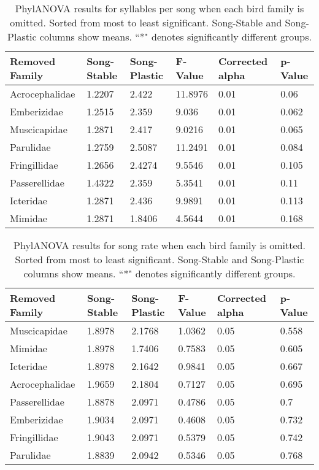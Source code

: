 \documentclass[a4paper,12pt]{article}
\begin{document}
\begin{table}[ht]
\caption{PhylANOVA results for syllables per song when each bird family is omitted.  Sorted from most to least significant.  Song-Stable and Song-Plastic columns show means.  ``*" denotes significantly different groups.}
\centering
\begin{tabular}{llllll}
  \hline
Removed Family & Song-Stable & Song-Plastic & F-Value & Corrected alpha & p-Value \\ 
  \hline
Acrocephalidae & 1.2207 & 2.422 & 11.8976 & 0.01 & 0.06 \\ 
  Emberizidae & 1.2515 & 2.359 & 9.036 & 0.01 & 0.062 \\ 
  Muscicapidae & 1.2871 & 2.417 & 9.0216 & 0.01 & 0.065 \\ 
  Parulidae & 1.2759 & 2.5087 & 11.2491 & 0.01 & 0.084 \\ 
  Fringillidae & 1.2656 & 2.4274 & 9.5546 & 0.01 & 0.105 \\ 
  Passerellidae & 1.4322 & 2.359 & 5.3541 & 0.01 & 0.11 \\ 
  Icteridae & 1.2871 & 2.436 & 9.9891 & 0.01 & 0.113 \\ 
  Mimidae & 1.2871 & 1.8406 & 4.5644 & 0.01 & 0.168 \\ 
   \hline
\end{tabular}
\end{table}

\begin{table}[ht]
\caption{PhylANOVA results for song rate when each bird family is omitted.  Sorted from most to least significant.  Song-Stable and Song-Plastic columns show means.  ``*" denotes significantly different groups.}
\centering
\begin{tabular}{llllll}
  \hline
Removed Family & Song-Stable & Song-Plastic & F-Value & Corrected alpha & p-Value \\ 
  \hline
Muscicapidae & 1.8978 & 2.1768 & 1.0362 & 0.05 & 0.558 \\ 
  Mimidae & 1.8978 & 1.7406 & 0.7583 & 0.05 & 0.605 \\ 
  Icteridae & 1.8978 & 2.1642 & 0.9841 & 0.05 & 0.667 \\ 
  Acrocephalidae & 1.9659 & 2.1804 & 0.7127 & 0.05 & 0.695 \\ 
  Passerellidae & 1.8878 & 2.0971 & 0.4786 & 0.05 & 0.7 \\ 
  Emberizidae & 1.9034 & 2.0971 & 0.4608 & 0.05 & 0.732 \\ 
  Fringillidae & 1.9043 & 2.0971 & 0.5379 & 0.05 & 0.742 \\ 
  Parulidae & 1.8839 & 2.0942 & 0.5346 & 0.05 & 0.768 \\ 
   \hline
\end{tabular}
\end{table}
\end{document}
